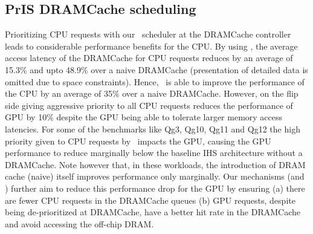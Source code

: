 \subsection{PrIS DRAMCache scheduling}
Prioritizing CPU requests with our \prioname\ scheduler at the DRAMCache controller leads to considerable performance benefits for the CPU. By using \prioname, the average access latency of the DRAMCache for CPU requests reduces by an average of 15.3\% and upto 48.9\% over a naive DRAMCache (presentation of detailed data is omitted due to space constraints). Hence, \prioname\ is able to improve the performance of the CPU by an average of 35\% over a naive DRAMCache. However, on the flip side giving aggressive priority to all CPU requests reduces the performance of GPU by 10\% despite the GPU being able to tolerate larger memory access latencies. For some of the benchmarks like Qg3, Qg10, Qg11 and Qg12 the high priority given to CPU requests by \prioname\ impacts the GPU, causing the GPU performance to reduce marginally below the baseline IHS architecture without a DRAMCache. Note however that, in these workloads, the introduction of DRAM cache (naive) itself improves performance only marginally. Our mechanisms (\bypassname and \chaining) further aim to reduce this performance drop for the GPU by ensuring (a) there are fewer CPU requests in the DRAMCache queues (b) GPU requests, despite being de-prioritized at DRAMCache, have a better hit rate in the DRAMCache and avoid accessing the off-chip DRAM.

